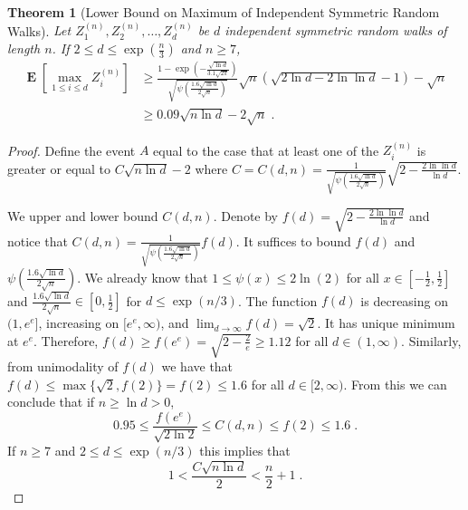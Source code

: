 \documentclass{article}
\DeclareMathOperator*{\Exp}{\mathbf{E}}
\newtheorem{theorem}{Theorem}
\begin{document}
\begin{theorem}[Lower Bound on Maximum of Independent Symmetric Random Walks]
\label{theorem:maximum-of-random-walks}
Let $Z^{(n)}_1, Z^{(n)}_2, \dots, Z^{(n)}_d$ be $d$ independent symmetric random walks of length $n$. If $2 \le d \le \exp(\frac{n}{3})$ and $n \ge 7$,
\begin{align*}
\Exp \left[ \max_{1 \le i \le d} Z^{(n)}_i \right]
& \ge \frac{1 - \exp\left(-\frac{\sqrt{\ln d}}{3.1 \sqrt{2\pi}}\right)}{\sqrt{\psi\left(\frac{1.6\sqrt{\ln d}}{2 \sqrt{n}}\right)}} \sqrt{n} \left(\sqrt{2 \ln d - 2 \ln \ln d}-1\right) - \sqrt{n} \\
& \ge 0.09 \sqrt{n \ln d} - 2 \sqrt{n} \; .
\end{align*}
\end{theorem}
%
\begin{proof}
Define the event $A$ equal to the case that at least one of the $Z^{(n)}_i$ is greater or equal to $C \sqrt{n \ln d}-2$ where
$C = C(d,n) = \frac{1}{\sqrt{\psi\left(\frac{1.6\sqrt{\ln d}}{2 \sqrt{n}}\right)}}\sqrt{2-\frac{2 \ln \ln d}{\ln d}}$.

We upper and lower bound $C(d,n)$. Denote by $f(d)=\sqrt{2-\frac{2 \ln \ln d}{\ln d}}$
and notice that $C(d,n) = \frac{1}{\sqrt{\psi\left( \frac{1.6\sqrt{\ln d}}{2 \sqrt{n}}\right)}} f(d)$.  It
suffices to bound $f(d)$ and $\psi( \frac{1.6\sqrt{\ln d}}{2 \sqrt{n}})$.
We already know that $1 \le \psi(x) \le 2 \ln(2)$ for all $x \in [-\frac{1}{2}, \frac{1}{2}]$
and $\frac{1.6\sqrt{\ln d}}{2\sqrt{n}} \in [0,\frac{1}{2}]$ for $d \leq \exp(n/3)$.
The function $f(d)$ is decreasing on $(1,e^e]$,
increasing on $[e^e, \infty)$, and $\lim_{d \to \infty} f(d) = \sqrt{2}$. It has
unique minimum at $e^e$. Therefore, $f(d) \ge f(e^e) = \sqrt{2 - \frac{2}{e}} \ge 1.12$
for all $d \in (1,\infty)$.  Similarly, from unimodality of $f(d)$ we have that
$f(d) \le \max\{\sqrt{2}, f(2)\} = f(2) \le 1.6$ for all $d \in [2, \infty)$.
From this we can conclude that if $n \ge \ln d > 0$,
\begin{equation}
\label{equation:bound-on-constant}
0.95 \le \frac{f(e^e)}{\sqrt{2 \ln 2}} \le C(d,n) \le f(2) \le 1.6 \; .
\end{equation}
If $n \ge 7$ and $2 \le d \le \exp(n/3)$ this implies that
\begin{equation}
\label{equation:conditions}
1 < \frac{C \sqrt{n \ln d}}{2} < \frac{n}{2} + 1 \; .
\end{equation}


\end{proof}
\end{document}

